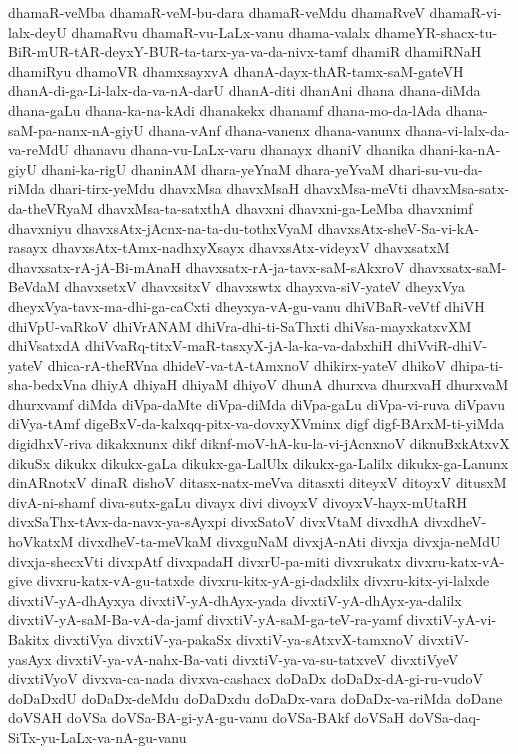{dhamaR-veMba
dhamaR-veM-bu-dara
dhamaR-veMdu
dhamaRveV
dhamaR-vi-lalx-deyU
dhamaRvu
dhamaR-vu-LaLx-vanu
dhama-valalx
dhameYR-shacx-tu-BiR-mUR-tAR-deyxY-BUR-ta-tarx-ya-va-da-nivx-tamf
dhamiR
dhamiRNaH
dhamiRyu
dhamoVR
dhamxsayxvA
dhanA-dayx-thAR-tamx-saM-gateVH
dhanA-di-ga-Li-lalx-da-va-nA-darU
dhanA-diti
dhanAni
dhana
dhana-diMda
dhana-gaLu
dhana-ka-na-kAdi
dhanakekx
dhanamf
dhana-mo-da-lAda
dhana-saM-pa-nanx-nA-giyU
dhana-vAnf
dhana-vanenx
dhana-vanunx
dhana-vi-lalx-da-va-reMdU
dhanavu
dhana-vu-LaLx-varu
dhanayx
dhaniV
dhanika
dhani-ka-nA-giyU
dhani-ka-rigU
dhaninAM
dhara-yeYnaM
dhara-yeYvaM
dhari-su-vu-da-riMda
dhari-tirx-yeMdu
dhavxMsa
dhavxMsaH
dhavxMsa-meVti
dhavxMsa-satx-da-theVRyaM
dhavxMsa-ta-satxthA
dhavxni
dhavxni-ga-LeMba
dhavxnimf
dhavxniyu
dhavxsAtx-jAcnx-na-ta-du-tothxVyaM
dhavxsAtx-sheV-Sa-vi-kA-rasayx
dhavxsAtx-tAmx-nadhxyXsayx
dhavxsAtx-videyxV
dhavxsatxM
dhavxsatx-rA-jA-Bi-mAnaH
dhavxsatx-rA-ja-tavx-saM-sAkxroV
dhavxsatx-saM-BeVdaM
dhavxsetxV
dhavxsitxV
dhavxswtx
dhayxva-siV-yateV
dheyxVya
dheyxVya-tavx-ma-dhi-ga-caCxti
dheyxya-vA-gu-vanu
dhiVBaR-veVtf
dhiVH
dhiVpU-vaRkoV
dhiVrANAM
dhiVra-dhi-ti-SaThxti
dhiVsa-mayxkatxvXM
dhiVsatxdA
dhiVvaRq-titxV-maR-tasxyX-jA-la-ka-va-dabxhiH
dhiVviR-dhiV-yateV
dhica-rA-theRVna
dhideV-va-tA-tAmxnoV
dhikirx-yateV
dhikoV
dhipa-ti-sha-bedxVna
dhiyA
dhiyaH
dhiyaM
dhiyoV
dhunA
dhurxva
dhurxvaH
dhurxvaM
dhurxvamf
diMda
diVpa-daMte
diVpa-diMda
diVpa-gaLu
diVpa-vi-ruva
diVpavu
diVya-tAmf
digeBxV-da-kalxqq-pitx-va-dovxyXVminx
digf
digf-BArxM-ti-yiMda
digidhxV-riva
dikakxnunx
dikf
diknf-moV-hA-ku-la-vi-jAcnxnoV
diknuBxkAtxvX
dikuSx
dikukx
dikukx-gaLa
dikukx-ga-LalUlx
dikukx-ga-Lalilx
dikukx-ga-Lanunx
dinARnotxV
dinaR
dishoV
ditasx-natx-meVva
ditasxti
diteyxV
ditoyxV
ditusxM
divA-ni-shamf
diva-sutx-gaLu
divayx
divi
divoyxV
divoyxV-hayx-mUtaRH
divxSaThx-tAvx-da-navx-ya-sAyxpi
divxSatoV
divxVtaM
divxdhA
divxdheV-hoVkatxM
divxdheV-ta-meVkaM
divxguNaM
divxjA-nAti
divxja
divxja-neMdU
divxja-shecxVti
divxpAtf
divxpadaH
divxrU-pa-miti
divxrukatx
divxru-katx-vA-give
divxru-katx-vA-gu-tatxde
divxru-kitx-yA-gi-dadxlilx
divxru-kitx-yi-lalxde
divxtiV-yA-dhAyxya
divxtiV-yA-dhAyx-yada
divxtiV-yA-dhAyx-ya-dalilx
divxtiV-yA-saM-Ba-vA-da-jamf
divxtiV-yA-saM-ga-teV-ra-yamf
divxtiV-yA-vi-Bakitx
divxtiVya
divxtiV-ya-pakaSx
divxtiV-ya-sAtxvX-tamxnoV
divxtiV-yasAyx
divxtiV-ya-vA-nahx-Ba-vati
divxtiV-ya-va-su-tatxveV
divxtiVyeV
divxtiVyoV
divxva-ca-nada
divxva-cashacx
doDaDx
doDaDx-dA-gi-ru-vudoV
doDaDxdU
doDaDx-deMdu
doDaDxdu
doDaDx-vara
doDaDx-va-riMda
doDane
doVSAH
doVSa
doVSa-BA-gi-yA-gu-vanu
doVSa-BAkf
doVSaH
doVSa-daq-SiTx-yu-LaLx-va-nA-gu-vanu
}
